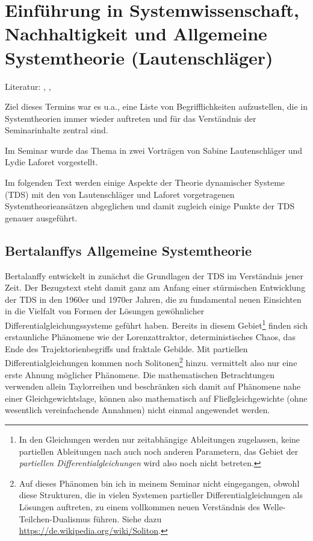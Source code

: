 \documentclass[11pt,a4paper]{article}
\begin{document}
\section{Einführung in Systemwissenschaft, Nachhaltigkeit und Allgemeine
Systemtheorie (Lautenschläger)}

Literatur: \cite{Bertalanffy1950}, \cite{Mele2010}, \cite{Binder2013}

Ziel dieses Termins war es u.a., eine Liste von Begriff\-lichkeiten
aufzustellen, die in Systemtheorien immer wieder auftreten und für das
Verständnis der Seminarinhalte zentral sind.

Im Seminar wurde das Thema in zwei Vorträgen von Sabine Lautenschläger und
Lydie Laforet vorgestellt.

Im folgenden Text werden einige Aspekte der Theorie dynamischer Systeme (TDS)
mit den von Lautenschläger und Laforet vorgetragenen Systemtheorieansätzen
abgeglichen und damit zugleich einige Punkte der TDS genauer ausgeführt.

\subsection{Bertalanffys Allgemeine Systemtheorie}

Bertalanffy entwickelt in \cite{Bertalanffy1950} zunächst die Grundlagen der
TDS im Verständnis jener Zeit.  Der Bezugstext steht damit ganz am Anfang
einer stürmischen Entwicklung der TDS in den 1960er und 1970er Jahren, die zu
fundamental neuen Einsichten in die Vielfalt von Formen der Lösungen
gewöhnlicher Differentialgleichungssysteme geführt haben.  Bereits in diesem
Gebiet\footnote{In den Gleichungen werden nur zeitabhängige Ableitungen
  zugelassen, keine partiellen Ableitungen nach auch noch anderen Parametern,
  das Gebiet der \emph{partiellen Differentialgleichungen} wird also noch
  nicht betreten.} finden sich erstaunliche Phänomene wie der Lorenzattraktor,
deterministisches Chaos, das Ende des Trajektorienbegriffs und fraktale
Gebilde. Mit partiellen Differentialgleichungen kommen noch
Solitonen\footnote{Auf dieses Phänomen bin ich in meinem Seminar nicht
  eingegangen, obwohl diese Strukturen, die in vielen Systemen partieller
  Differentialgleichungen als Lösungen auftreten, zu einem vollkommen neuen
  Verständnis des Welle-Teilchen-Dualismus führen. Siehe dazu
  \url{https://de.wikipedia.org/wiki/Soliton}. } hinzu. \cite{Bertalanffy1950}
vermittelt also nur eine erste Ahnung möglicher Phänomene. Die mathematischen
Betrachtungen verwenden allein Taylorreihen und beschränken sich damit auf
Phänomene nahe einer Gleichgewichtslage, können also mathematisch auf
Fließgleichgewichte (ohne wesentlich vereinfachende Annahmen) nicht einmal
angewendet werden.
\end{document}
